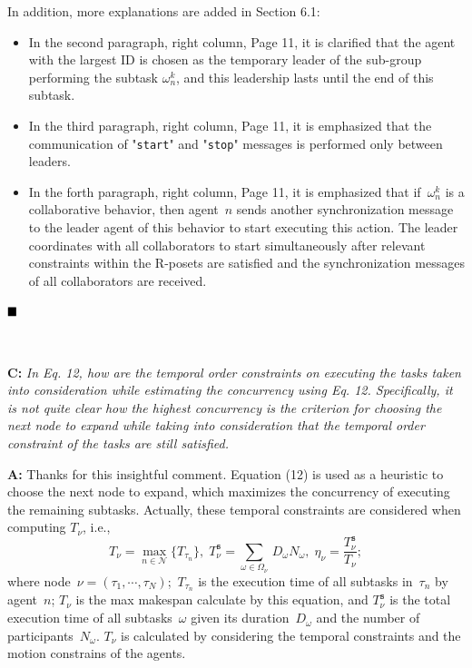 \documentclass[10pt]{article}
\begin{document}
In addition, more explanations are added in Section 6.1:
\begin{itemize}
\item In the second paragraph, right column, Page 11,
it is clarified that the agent with the largest ID is chosen as the
temporary leader of the sub-group performing the subtask $\omega^k_n$,
and this leadership lasts until the end of this subtask.

\item In the third paragraph, right column, Page 11, it is emphasized that
  the communication of "\texttt{start}" and "\texttt{stop}" messages is performed only between leaders.

\item In the forth paragraph, right column, Page 11,
it is emphasized that
if~$\omega^k_n$ is a collaborative behavior, then
agent~$n$ sends another synchronization message to the leader agent
of this behavior to start executing this action.
The leader coordinates with all collaborators to start simultaneously
after relevant constraints within the R-posets are satisfied and
the synchronization messages of all collaborators are received.
\end{itemize}
$\hfill\blacksquare$

\hspace*{\fill} \






\textbf{C:}
\emph{In Eq. 12, how are the temporal order constraints on executing the
	tasks taken into consideration while estimating the concurrency using
	Eq. 12. Specifically, it is not quite clear how the highest concurrency
	is the criterion for choosing the next node to expand while taking into
	consideration that the temporal order constraint of the tasks are still
	satisfied.
}

\textbf{A:} Thanks for this insightful comment.
Equation (12) is used as a heuristic to choose the next node to expand,
which maximizes the concurrency of executing the remaining subtasks.
Actually, these temporal constraints are considered when computing $T_{\nu}$, i.e.,
\begin{equation*}\label{eq:node-makespan}
T_\nu = \max_{n\in\mathcal{N}} \{T_{\tau_n}\},\;
T^{\texttt{s}}_\nu = \sum_{\omega\in\Omega_\nu}\, D_{\omega}N_\omega,\;
\eta_\nu = \frac{T^{\texttt{s}}_\nu}{T_\nu};
\end{equation*}
where node~$\nu=(\tau_1,\cdots,\tau_N)$;~$T_{\tau_n}$ is the execution
time of all subtasks in~$\tau_n$ by agent~$n$; $T_\nu$ is the max makespan calculate by this equation,
and $T^{\texttt{s}}_\nu$ is the total execution time of all subtasks~$\omega$
given its duration~$D_\omega$ and the number of participants~$N_\omega$.
$T_{\nu}$ is calculated by considering the temporal constraints and the motion
constrains of the agents.
\end{document}
